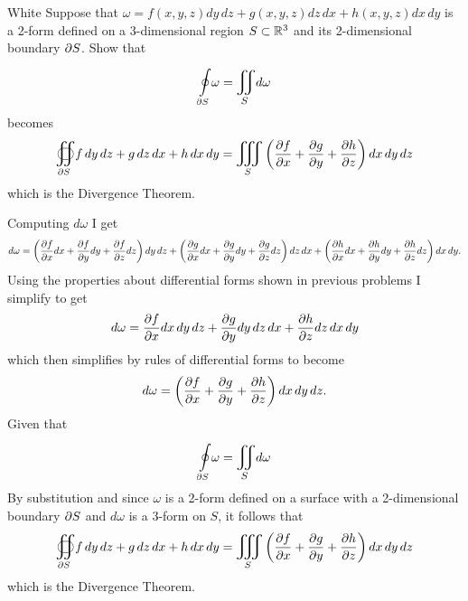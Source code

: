 \documentclass[titlepage]{article}
\begin{document}
\begin{cproblem}{5}{White}
Suppose that $\omega = f(x,y,z)dy\,dz + g(x,y,z)dz\,dx + h(x,y,z)dx\,dy$ is a 2-form defined on a 3-dimensional region $S \subset \mathbb{R}^3$ and its 2-dimensional boundary $\partial S$. Show that
$$\boint{\p S}{} \omega = \bigiint{S}{} d\omega $$
becomes
$$\mathlarger\oiint\displaylimits_{\p S}  f\,dy\,dz + g\,dz\,dx + h\,dx\,dy = \mathlarger\iiint\displaylimits_{S} \left(\frac{\p f}{\p x} + \frac{\p g}{\p y} + \frac{\p h}{\p z}\right)dx\,dy\,dz$$
which is the Divergence Theorem.
\end{cproblem}
\begin{solution}
Computing $d\omega$ I get
$$d\omega = \left(\frac{\partial f}{\partial x} dx + \frac{\partial f}{\partial y} dy + \frac{\partial f}{\partial z} dz\right)dy\,dz + \left(\frac{\partial g}{\partial x} dx + \frac{\partial g}{\partial y} dy + \frac{\partial g}{\partial z} dz\right)dz\,dx + \left(\frac{\partial h}{\partial x} dx + \frac{\partial h}{\partial y} dy + \frac{\partial h}{\partial z} dz\right)dx\,dy. $$
Using the properties about differential forms shown in previous problems I simplify to get
$$d\omega =  \frac{\partial f}{\partial x}dx\,dy\,dz + \frac{\partial g}{\partial y}dy\,dz\,dx + \frac{\partial h}{\partial z}dz\,dx\,dy$$
which then simplifies by rules of differential forms to become
$$d\omega = \left( \frac{\partial f}{\partial x} + \frac{\partial g}{\partial y} + \frac{\partial h}{\partial z}\right)dx\,dy\,dz.$$
Given that
$$\boint{\p S}{} \omega = \bigiint{S}{} d\omega $$
By substitution and since $\omega$ is a 2-form defined on a surface with a 2-dimensional boundary $\partial S$ and $d\omega$ is a 3-form on $S$, it follows that 
$$\mathlarger\oiint\displaylimits_{\p S}  f\,dy\,dz + g\,dz\,dx + h\,dx\,dy = \mathlarger\iiint\displaylimits_{S} \left(\frac{\p f}{\p x} + \frac{\p g}{\p y} + \frac{\p h}{\p z}\right)dx\,dy\,dz$$
which is the Divergence Theorem.
\end{solution}
\end{document}

